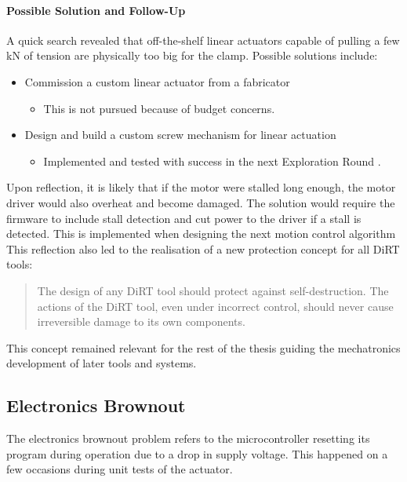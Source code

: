 \paragraph{Possible Solution and Follow-Up}

A quick search revealed that off-the-shelf linear actuators capable of pulling a few kN of tension are physically too big for the clamp. Possible solutions include:

\begin{itemize}[nosep]
    \item Commission a custom linear actuator from a fabricator
    \begin{itemize}
        \item This is not pursued because of budget concerns.
    \end{itemize}
    \item Design and build a custom screw mechanism for linear actuation
    \begin{itemize}
        \item Implemented and tested with success in the next Exploration Round . 
    \end{itemize}
\end{itemize}

Upon reflection, it is likely that if the motor were stalled long enough, the motor driver would also overheat and become damaged. The solution would require the firmware to include stall detection and cut power to the driver if a stall is detected. This is implemented when designing the next motion control algorithm 
This reflection also led to the realisation of a new protection concept for all DiRT tools: 
\begin{quote}
    The design of any DiRT tool should protect against self-destruction. The actions of the DiRT tool, even under incorrect control, should never cause irreversible damage to its own components.
\end{quote} 
This concept remained relevant for the rest of the thesis guiding the mechatronics development of later tools and systems.

\subsection{Electronics Brownout}
\label{subsection:exploration-1-electronics-brownout}

The electronics brownout problem refers to the microcontroller resetting its program  during operation due to a drop in supply voltage. This happened on a few occasions during unit tests of the actuator.

